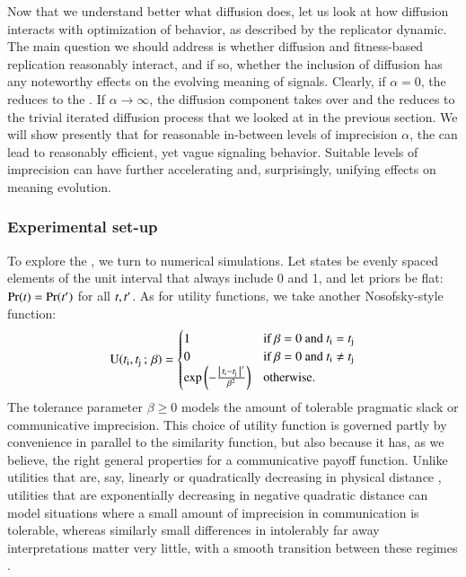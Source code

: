 \documentclass[fleqn,reqno,10pt]{article}
\newcommand{\rd}{\acro{rd}} %
\newcommand{\rdd}{\acro{rdd}} %
\newcommand{\imprecision}{\ensuremath{\alpha}} %
\newcommand{\toler}{\ensuremath{\beta}} %
\begin{document}
Now that we understand better what diffusion does, let us look at how
diffusion interacts with optimization of behavior, as described by the
replicator dynamic. The main question we should address is whether
diffusion and fitness-based replication reasonably interact, and if
so, whether the inclusion of diffusion has any noteworthy effects on
the evolving meaning of signals. Clearly, if $\imprecision = 0$, the
\rdd reduces to the \rd. If $\imprecision \rightarrow \infty$, the
diffusion component takes over and the \rdd reduces to the trivial
iterated diffusion process that we looked at in the previous
section. We will show presently that for reasonable in-between levels
of imprecision $\imprecision$, the \rdd can lead to reasonably
efficient, yet vague signaling behavior. Suitable levels of
imprecision can have further accelerating and, surprisingly, unifying
effects on meaning evolution.

\subsubsection{Experimental set-up}

To explore the \rdd, we turn to numerical simulations. Let states be
evenly spaced elements of the unit interval that always include 0 and
1, and let priors be flat: $\Pr(t) = \Pr(t')$ for all
$t, t'$. As for utility functions, we take another
Nosofsky-style function:
\begin{align*}
  \util(\mystate{i}, \mystate{j} \myts ; \myts \toler) =
      \begin{cases}
    1 & \textrm{if } \toler = 0 \textrm{ and } \mystate{i} = \mystate{j} \\
    0 & \textrm{if } \toler = 0 \textrm{ and } \mystate{i} \neq \mystate{j} \\
 \expo \left ( -  \frac{\card{\mystate{i} - \mystate{j}}^s}{ \toler^2} \right ) & \textrm{otherwise.} \\
    \end{cases}
\end{align*}
The tolerance parameter $\toler \ge 0$ models the amount of tolerable
pragmatic slack or communicative imprecision. This choice of utility
function is governed partly by convenience in parallel to the
similarity function, but also because it has, as we believe, the right
general properties for a communicative payoff function. Unlike
utilities that are, say, linearly or quadratically decreasing in
physical distance \citep[c.f.][]{JagerMetzger2011:Voronoi-Languag,FrankeJager2010:Vagueness-Signa},
utilities that are exponentially decreasing in negative quadratic
distance can model situations where a small amount of imprecision in
communication is tolerable, whereas similarly small differences in
intolerably far away interpretations matter very little, with a smooth
transition between these regimes
\citep[c.f.][]{OConnor2013:The-Evolution-o}.
\end{document}
